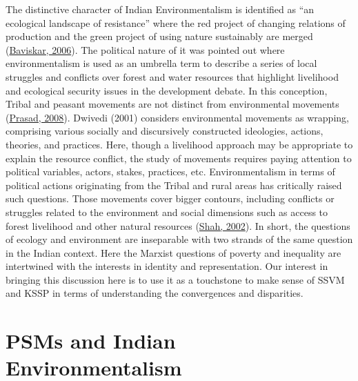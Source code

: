\documentclass[twoside, 13pt]{article}
\begin{document}
{The distinctive character of Indian Environmentalism is identified as “an ecological landscape of resistance” where the red project of changing relations of production and the green project of using nature sustainably are merged (\underline{Baviskar, 2006}). The political nature of it was pointed out where environmentalism is used as an umbrella term to describe a series of local struggles and conflicts over forest and water resources that highlight livelihood and ecological security issues in the development debate. In this conception, Tribal and peasant movements are not distinct from environmental movements (\underline{Prasad, 2008}). Dwivedi (2001) considers environmental movements as wrapping, comprising various socially and discursively constructed ideologies, actions, theories, and practices. Here, though a livelihood approach may be appropriate to explain the resource conflict, the study of movements requires paying attention to political variables, actors, stakes, practices, etc. Environmentalism in terms of political actions originating from the Tribal and rural areas has critically raised such questions. Those movements cover bigger contours, including conflicts or struggles related to the environment and social dimensions such as access to forest livelihood and other natural resources (\underline{Shah, 2002}). In short, the questions of ecology and environment are inseparable with two strands of the same question in the Indian context. Here the Marxist questions of poverty and inequality are intertwined with the interests in identity and representation. Our interest in bringing this discussion here is to use it as a touchstone to make sense of SSVM and KSSP in terms of understanding the convergences and disparities.}




{\fontsize{18}{20}\selectfont\section*{PSMs and Indian Environmentalism}}


\vspace{-.3cm}
\end{document}
